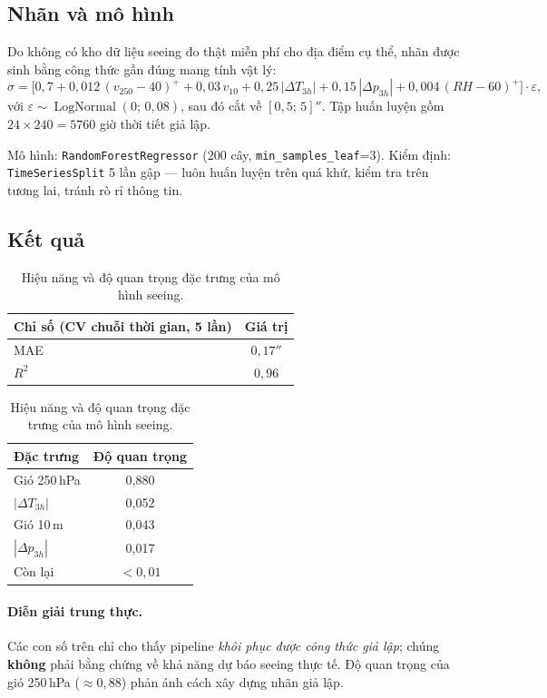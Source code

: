 \documentclass[12pt,a4paper]{article}
\newcommand{\arcsec}{\ensuremath{''}}
\begin{document}
\subsection{Nhãn và mô hình}
Do không có kho dữ liệu seeing đo thật miễn phí cho địa điểm cụ thể, nhãn được sinh bằng công
thức gần đúng mang tính vật lý:
\begin{equation}
\sigma = \Big[0{,}7 + 0{,}012\,(v_{250}-40)^+ + 0{,}03\,v_{10} + 0{,}25\,|\Delta T_{3h}|
 + 0{,}15\,|\Delta p_{3h}| + 0{,}004\,(RH-60)^+\Big]\cdot\varepsilon,
\end{equation}
với $\varepsilon\sim\operatorname{LogNormal}(0;\,0{,}08)$, sau đó cắt về $[0{,}5;\,5]\arcsec$.
Tập huấn luyện gồm $24\times240 = 5760$ giờ thời tiết giả lập.

Mô hình: \texttt{RandomForestRegressor} (200 cây, \texttt{min\_samples\_leaf}=3).
Kiểm định: \texttt{TimeSeriesSplit} 5 lần gập --- luôn huấn luyện trên quá khứ, kiểm tra trên
tương lai, tránh rò rỉ thông tin.

\subsection{Kết quả}
\begin{table}[h]
\centering
\begin{tabular}{lc}
\toprule
\textbf{Chỉ số (CV chuỗi thời gian, 5 lần)} & \textbf{Giá trị} \\
\midrule
MAE  & $0{,}17\arcsec$ \\
$R^2$ & $0{,}96$ \\
\bottomrule
\end{tabular}
\quad
\begin{tabular}{lc}
\toprule
\textbf{Đặc trưng} & \textbf{Độ quan trọng} \\
\midrule
Gió 250\,hPa & 0,880 \\
$|\Delta T_{3h}|$ & 0,052 \\
Gió 10\,m & 0,043 \\
$|\Delta p_{3h}|$ & 0,017 \\
Còn lại & $<0{,}01$ \\
\bottomrule
\end{tabular}
\caption{Hiệu năng và độ quan trọng đặc trưng của mô hình seeing.}
\end{table}

\paragraph{Diễn giải trung thực.}
Các con số trên chỉ cho thấy pipeline \emph{khôi phục được công thức giả lập}; chúng
\textbf{không} phải bằng chứng về khả năng dự báo seeing thực tế. Độ quan trọng của gió
250\,hPa ($\approx 0{,}88$) phản ánh cách xây dựng nhãn giả lập.
\end{document}
